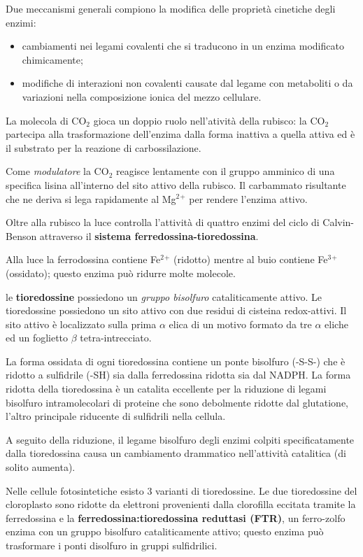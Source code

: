 \documentclass[]{article}
\begin{document}
Due meccanismi generali compiono la modifica delle proprietà cinetiche
degli enzimi:

\begin{itemize}
\itemsep1pt\parskip0pt
\item
  cambiamenti nei legami covalenti che si traducono in un enzima
  modificato chimicamente;
\item
  modifiche di interazioni non covalenti causate dal legame con
  metaboliti o da variazioni nella composizione ionica del mezzo
  cellulare.
\end{itemize}

La molecola di CO$_2$ gioca un doppio ruolo nell'atività della rubisco:
la CO$_2$ partecipa alla trasformazione dell'enzima dalla forma inattiva
a quella attiva ed è il substrato per la reazione di carbossilazione.

Come \emph{modulatore} la CO$_2$ reagisce lentamente con il gruppo
amminico di una specifica lisina all'interno del sito attivo della
rubisco. Il carbammato risultante che ne deriva si lega rapidamente al
Mg$^2$$^+$ per rendere l'enzima attivo.

Oltre alla rubisco la luce controlla l'attività di quattro enzimi del
ciclo di Calvin-Benson attraverso il \textbf{sistema
ferredossina-tioredossina}.

Alla luce la ferrodossina contiene Fe$^2$$^+$ (ridotto) mentre al buio
contiene Fe$^3$$^+$ (ossidato); questo enzima può ridurre molte
molecole.

le \textbf{tioredossine} possiedono un \emph{gruppo bisolfuro}
cataliticamente attivo. Le tioredossine possiedono un sito attivo con
due residui di cisteina redox-attivi. Il sito attivo è localizzato sulla
prima $\alpha$ elica di un motivo formato da tre $\alpha$ eliche ed un
foglietto $\beta$ tetra-intrecciato.

La forma ossidata di ogni tioredossina contiene un ponte bisolfuro
(-S-S-) che è ridotto a sulfidrile (-SH) sia dalla ferredossina ridotta
sia dal NADPH. La forma ridotta della tioredossina è un catalita
eccellente per la riduzione di legami bisolfuro intramolecolari di
proteine che sono debolmente ridotte dal glutatione, l'altro principale
riducente di sulfidrili nella cellula.

A seguito della riduzione, il legame bisolfuro degli enzimi colpiti
specificatamente dalla tioredossina causa un cambiamento drammatico
nell'attività catalitica (di solito aumenta).

Nelle cellule fotosintetiche esisto 3 varianti di tioredossine. Le due
tioredossine del cloroplasto sono ridotte da elettroni provenienti dalla
clorofilla eccitata tramite la ferredossina e la
\textbf{ferredossina:tioredossina reduttasi (FTR)}, un ferro-zolfo
enzima con un gruppo bisolfuro cataliticamente attivo; questo enzima può
trasformare i ponti disolfuro in gruppi sulfidrilici.
\end{document}
